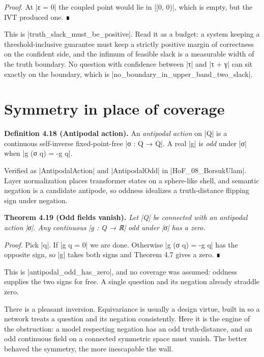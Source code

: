 \documentclass{memoir}
\begin{document}
\emph{Proof.} At \LeanVerb|ε = 0| the coupled point would lie in \LeanVerb|[0, 0)|, which is empty, but the
IVT produced one. ∎

This is \LeanVerb|truth_slack_must_be_positive|. Read it as a budget: a system keeping a
threshold-inclusive guarantee must keep a strictly positive margin of
correctness on the confident side, and the infimum of feasible slack is a
measurable width of the truth boundary. No question with confidence between \LeanVerb|τ|
and \LeanVerb|τ + γ| can sit exactly on the boundary, which is
\LeanVerb|no_boundary_in_upper_band_two_slack|.



\section{Symmetry in place of coverage}\label{Two--Schemas--of--Impossibility-005F-005F-005F--Machine--Checked--Limits--of--Trustworthy--Machine--Learning-005F-005F-005F--and--Why--They--Tighten--with--Capability----From--Logic--to--Analysis----Symmetry--in--place--of--coverage}

\textbf{Definition 4.18 (Antipodal action).} An \emph{antipodal action} on \LeanVerb|Q| is a continuous
self-inverse fixed-point-free \LeanVerb|σ : Q → Q|. A real \LeanVerb|g| is \emph{odd} under \LeanVerb|σ| when \LeanVerb|g (σ q) = -g q|.

Verified as \LeanVerb|AntipodalAction| and \LeanVerb|AntipodalOdd| in \LeanVerb|HoF_08_BorsukUlam|. Layer
normalization places transformer states on a sphere-like shell, and semantic
negation is a candidate antipode, so oddness idealizes a truth-distance flipping
sign under negation.

\textbf{Theorem 4.19 (Odd fields vanish).} \emph{Let \LeanVerb|Q| be connected with an antipodal action
\LeanVerb|σ|. Any continuous \LeanVerb|g : Q → ℝ| odd under \LeanVerb|σ| has a zero.}

\emph{Proof.} Pick \LeanVerb|q|. If \LeanVerb|g q = 0| we are done. Otherwise \LeanVerb|g (σ q) = -g q| has the
opposite sign, so \LeanVerb|g| takes both signs and Theorem 4.7 gives a zero. ∎

This is \LeanVerb|antipodal_odd_has_zero|, and no coverage was assumed: oddness supplies
the two signs for free. A single question and its negation already straddle
zero.

There is a pleasant inversion. Equivariance is usually a design virtue, built in
so a network treats a question and its negation consistently. Here it is the
engine of the obstruction: a model respecting negation has an odd
truth-distance, and an odd continuous field on a connected symmetric space must
vanish. The better behaved the symmetry, the more inescapable the wall.
\end{document}
